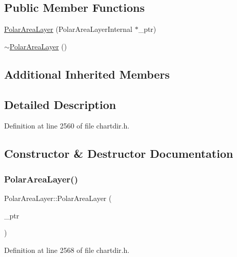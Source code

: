 \subsection*{Public Member Functions}
\begin{DoxyCompactItemize}
\item 
\hyperlink{class_polar_area_layer_a5405898858223a4b169968ba23b76b04}{Polar\+Area\+Layer} (Polar\+Area\+Layer\+Internal $\ast$\+\_\+ptr)
\item 
\hyperlink{class_polar_area_layer_af0a9fc349b29ebcc8d1c53e567f0f1e8}{$\sim$\+Polar\+Area\+Layer} ()
\end{DoxyCompactItemize}
\subsection*{Additional Inherited Members}


\subsection{Detailed Description}


Definition at line 2560 of file chartdir.\+h.



\subsection{Constructor \& Destructor Documentation}
\mbox{\label{class_polar_area_layer_a5405898858223a4b169968ba23b76b04}} 
\subsubsection{\texorpdfstring{Polar\+Area\+Layer()}{PolarAreaLayer()}}
{\footnotesize\ttfamily Polar\+Area\+Layer\+::\+Polar\+Area\+Layer (\begin{DoxyParamCaption}\item[{Polar\+Area\+Layer\+Internal $\ast$}]{\+\_\+ptr }\end{DoxyParamCaption})\hspace{0.3cm}{\ttfamily [inline]}}



Definition at line 2568 of file chartdir.\+h.

\mbox{\label{class_polar_area_layer_af0a9fc349b29ebcc8d1c53e567f0f1e8}} 
